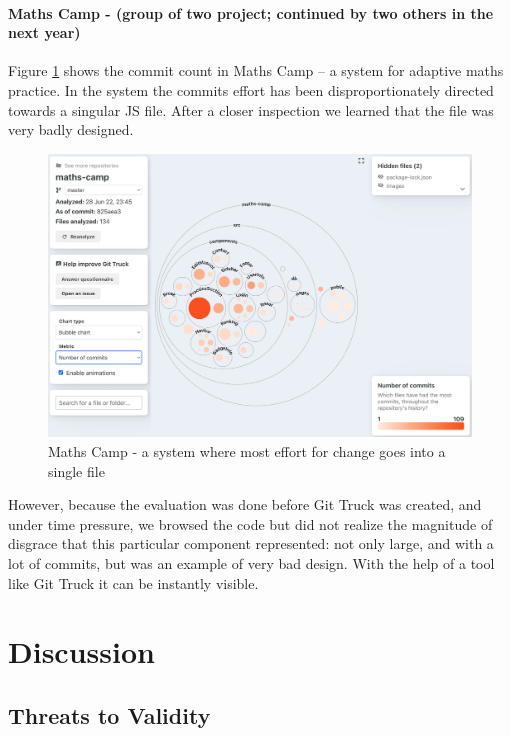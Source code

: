 \documentclass[conference]{IEEEtran}
\begin{document}
\paragraph{Maths Camp - (group of two project; continued by two others in the next year)}

Figure \ref{fig:mathscamp} shows the commit count in Maths Camp -- a system for adaptive maths practice. In the system the commits effort has been disproportionately directed towards a singular JS file. After a closer inspection we learned that the file was very badly designed. 

    \begin{figure}[h!]
    \centering
    \includegraphics[width=0.9\linewidth]{img/maths-camp.png}
    \caption{Maths Camp - a system where most effort for change goes into a single file}
    \label{fig:mathscamp}
    \end{figure}


However, because the evaluation was done before Git Truck was created, and under time pressure, we browsed the code but did not realize the magnitude of disgrace that this particular component represented: not only large, and with a lot of commits, but was an example of very bad design. With the help of a tool like Git Truck it can be instantly visible. 




\section{Discussion}

\subsection{Threats to Validity}
\end{document}
